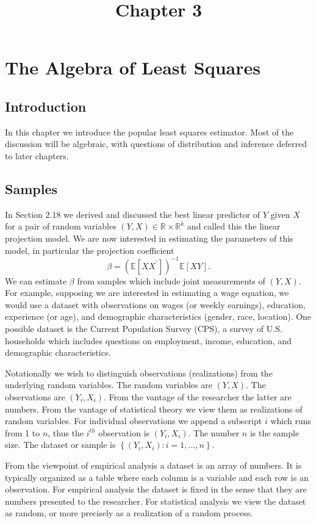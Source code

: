 \documentclass[10pt]{article}
\title{Chapter 3 }
\author{}
\date{}
\begin{document}
\maketitle
\section{The Algebra of Least Squares}
\subsection{Introduction}
In this chapter we introduce the popular least squares estimator. Most of the discussion will be algebraic, with questions of distribution and inference deferred to later chapters.

\subsection{Samples}
In Section $2.18$ we derived and discussed the best linear predictor of $Y$ given $X$ for a pair of random variables $(Y, X) \in \mathbb{R} \times \mathbb{R}^{k}$ and called this the linear projection model. We are now interested in estimating the parameters of this model, in particular the projection coefficient
$$
\beta=\left(\mathbb{E}\left[X X^{\prime}\right]\right)^{-1} \mathbb{E}[X Y] .
$$
We can estimate $\beta$ from samples which include joint measurements of $(Y, X)$. For example, supposing we are interested in estimating a wage equation, we would use a dataset with observations on wages (or weekly earnings), education, experience (or age), and demographic characteristics (gender, race, location). One possible dataset is the Current Population Survey (CPS), a survey of U.S. households which includes questions on employment, income, education, and demographic characteristics.

Notationally we wish to distinguish observations (realizations) from the underlying random variables. The random variables are $(Y, X)$. The observations are $\left(Y_{i}, X_{i}\right)$. From the vantage of the researcher the latter are numbers. From the vantage of statistical theory we view them as realizations of random variables. For individual observations we append a subscript $i$ which runs from 1 to $n$, thus the $i^{t h}$ observation is $\left(Y_{i}, X_{i}\right)$. The number $n$ is the sample size. The dataset or sample is $\left\{\left(Y_{i}, X_{i}\right): i=1, \ldots, n\right\}$.

From the viewpoint of empirical analysis a dataset is an array of numbers. It is typically organized as a table where each column is a variable and each row is an observation. For empirical analysis the dataset is fixed in the sense that they are numbers presented to the researcher. For statistical analysis we view the dataset as random, or more precisely as a realization of a random process.
\end{document}
